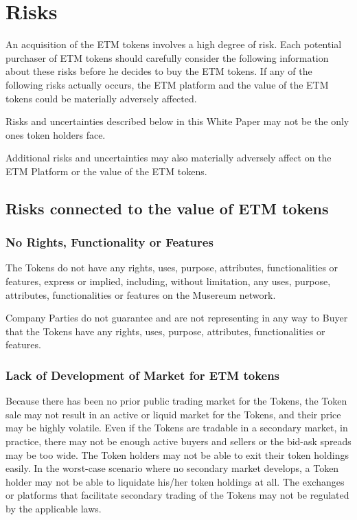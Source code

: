 \documentclass[12pt]{report}
\begin{document}
\chapter{Risks}
\begin{multicols}{2}
\label{risks}

An acquisition of the ETM tokens involves a high degree of risk. Each potential purchaser of ETM tokens should carefully consider the following information about these risks before he decides to buy the ETM tokens. If any of the following risks actually occurs, the ETM platform and the value of the ETM tokens could be materially adversely affected.

Risks and uncertainties described below in this White Paper may not be the only ones token holders face.

Additional risks and uncertainties may also materially adversely affect on the ETM Platform or the value of the ETM tokens.

\section{Risks connected to the value of ETM tokens}
\label{risks-value}
\subsection{No Rights, Functionality or Features}
\label{risks-value-rights}
The Tokens do not have any rights, uses, purpose, attributes, functionalities or features, express or implied, including, without limitation, any uses, purpose, attributes, functionalities or features on the Musereum network.

Company Parties do not guarantee and are not representing in any way to Buyer that the Tokens have any rights, uses, purpose, attributes, functionalities or features.

\subsection{Lack of Development of Market for ETM tokens}
\label{risks-value-lack}
Because there has been no prior public trading market for the Tokens, the Token sale may not result in an active or liquid market for the Tokens, and their price may be highly volatile. Even if the Tokens are tradable in a secondary market, in practice, there may not be enough active buyers and sellers or the bid-ask spreads may be too wide. The Token holders may not be able to exit their token holdings easily. In the worst-case scenario where no secondary market develops, a Token holder may not be able to liquidate his/her token holdings at all. The exchanges or platforms that facilitate secondary trading of the Tokens may not be regulated by the applicable laws.


\end{multicols}
\end{document}
